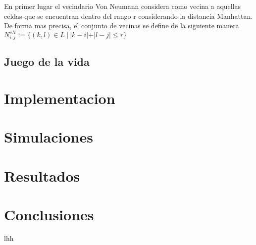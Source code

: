 \documentclass[11pt]{article}
\begin{document}
    En primer lugar el vecindario Von Neumann considera como vecina a aquellas celdas que se encuentran dentro del rango r
    considerando la distancia Manhattan. De forma mas precisa, el conjunto de vecinas se define de la siguiente manera
    $N_{i,j}^{vN}:=\{(k,l) \in L\ |\ |k-i|+ |l - j| \leq r\}$


    \subsection{Juego de la vida}



    \section{Implementacion}


    \section{Simulaciones}


    \section{Resultados}


    \section{Conclusiones}

    lhh
\end{document}
